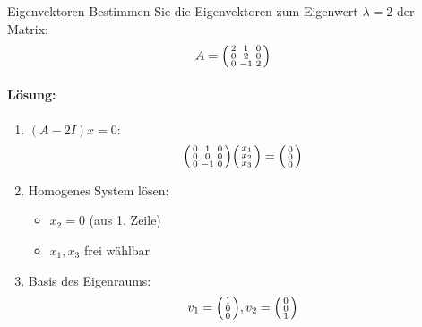 \begin{example2}{Eigenvektoren}
Bestimmen Sie die Eigenvektoren zum Eigenwert $\lambda=2$ der Matrix:
$$A = \begin{psmallmatrix}
2 & 1 & 0 \\
0 & 2 & 0 \\
0 & -1 & 2
\end{psmallmatrix}$$

\paragraph{Lösung:}
\begin{enumerate}
    \item $(A-2I)x = 0$:
    $$\begin{psmallmatrix}
    0 & 1 & 0 \\
    0 & 0 & 0 \\
    0 & -1 & 0
    \end{psmallmatrix} \begin{psmallmatrix}
    x_1 \\ x_2 \\ x_3
    \end{psmallmatrix} = \begin{psmallmatrix}
    0 \\ 0 \\ 0
    \end{psmallmatrix}$$
    
    \item Homogenes System lösen:
    \begin{itemize}
        \item $x_2 = 0$ (aus 1. Zeile)
        \item $x_1, x_3$ frei wählbar
    \end{itemize}
    
    \item Basis des Eigenraums:
    $$v_1 = \begin{psmallmatrix} 1 \\ 0 \\ 0 \end{psmallmatrix}, 
    v_2 = \begin{psmallmatrix} 0 \\ 0 \\ 1 \end{psmallmatrix}$$
\end{enumerate}
\end{example2}




